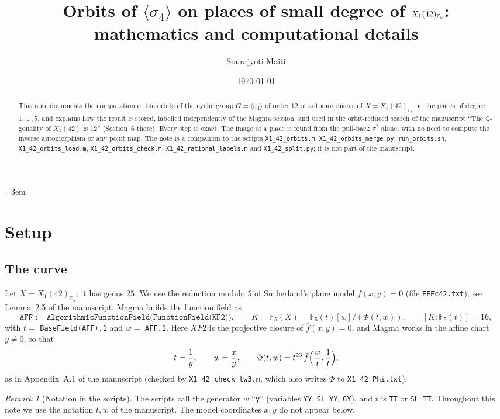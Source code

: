 \documentclass[11pt]{amsart}
\title[Orbits on places of small degree]{Orbits of $\langle\sigma_4\rangle$ on places of small degree of $X_1(42)_{\F_5}$:\\ mathematics and computational details}
\author{Sourajyoti Maiti}
\date{\today}
\theoremstyle{definition}
\theoremstyle{remark}
\newtheorem{remark}[theorem]{Remark}
\newcommand{\F}{\mathbb{F}}
\newcommand{\code}[1]{\texttt{#1}}
\begin{document}
\sloppy\emergencystretch=3em

\begin{abstract}
This note documents the computation of the orbits of the cyclic group $G=\langle\sigma_4\rangle$ of order $12$ of automorphisms of $X=X_1(42)_{\F_5}$ on the places of degree $1,\dots,5$, and explains how the result is stored, labelled independently of the Magma session, and used in the orbit-reduced search of the manuscript ``The $\mathbb{Q}$-gonality of $X_1(42)$ is $12$'' (Section~6 there). Every step is exact. The image of a place is found from the pull-back $\sigma^*$ alone, with no need to compute the inverse automorphism or any point map. The note is a companion to the scripts \code{X1\_42\_orbits.m}, \code{X1\_42\_orbits\_merge.py}, \code{run\_orbits.sh}, \code{X1\_42\_orbits\_load.m}, \code{X1\_42\_orbits\_check.m}, \code{X1\_42\_rational\_labels.m} and \code{X1\_42\_split.py}; it is not part of the manuscript.
\end{abstract}

\maketitle
\tableofcontents

\section{Setup}

\subsection{The curve}
Let $X=X_1(42)_{\F_5}$; it has genus $25$. We use the reduction modulo $5$ of Sutherland's plane model $f(x,y)=0$ (file \code{FFFc42.txt}); see Lemma~2.5 of the manuscript. Magma builds the function field as
\[
\code{AFF := AlgorithmicFunctionField(FunctionField(XF2))},\qquad
K=\F_5(X)=\F_5(t)[w]/(\Phi(t,w)),\qquad [K:\F_5(t)]=16,
\]
with $t=$ \code{BaseField(AFF).1} and $w=$ \code{AFF.1}. Here $XF2$ is the projective closure of $\bar f(x,y)=0$, and Magma works in the affine chart $y\neq0$, so that
\[
t=\frac1y,\qquad w=\frac xy,\qquad \Phi(t,w)=t^{23}\,\bar f\Bigl(\frac wt,\frac1t\Bigr),
\]
as in Appendix~A.1 of the manuscript (checked by \code{X1\_42\_check\_tw3.m}, which also writes $\Phi$ to \code{X1\_42\_Phi.txt}).

\begin{remark}[Notation in the scripts]
The scripts call the generator $w$ ``\code{y}'' (variables \code{YY}, \code{SL\_YY}, \code{GY}), and $t$ is \code{TT} or \code{SL\_TT}. Throughout this note we use the notation $t,w$ of the manuscript. The model coordinates $x,y$ do not appear below.
\end{remark}
\end{document}
